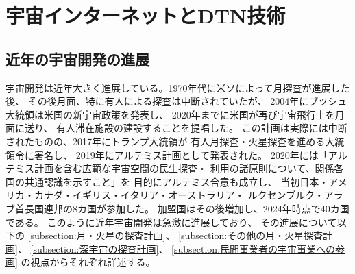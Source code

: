\chapter{宇宙インターネットとDTN技術}
\label{chap:prerequisite_knowledge}

\section{近年の宇宙開発の進展}
宇宙開発は近年大きく進展している。1970年代に米ソによって月探査が進展した後、
その後月面、特に有人による探査は中断されていたが、
2004年にブッシュ大統領は米国の新宇宙政策を発表し、
2020年までに米国が再び宇宙飛行士を月面に送り、
有人滞在施設の建設することを提唱した。\cite{久保田2009}
この計画は実際には中断されたものの、2017年にトランプ大統領が
有人月探査・火星探査を進める大統領令に署名し、
2019年にアルテミス計画として発表された。\cite{nasa2020}
2020年には「アルテミス計画を含む広範な宇宙空間の民生探査・
利用の諸原則について、関係各国の共通認識を示すこと」を
目的にアルテミス合意\cite{artemis_agreement1}も成立し、
当初日本・アメリカ・カナダ・イギリス・イタリア・オーストラリア・
ルクセンブルク・アラブ首長国連邦の8カ国が参加した。\cite{artemis_agreement2}
加盟国はその後増加し、2024年時点で40カ国である。\cite{artemis_agreement3}
このように近年宇宙開発は急激に進展しており、
その進展について以下の
\ref{subsection:月・火星の探査計画}、
\ref{subsection:その他の月・火星探査計画}、
\ref{subsection:深宇宙の探査計画}、
\ref{subsection:民間事業者の宇宙事業への参画}
の視点からそれぞれ詳述する。



